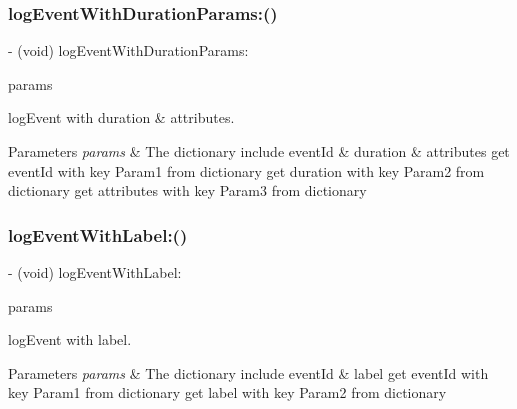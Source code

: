 \subsubsection{\texorpdfstring{log\+Event\+With\+Duration\+Params\+:()}{logEventWithDurationParams:()}}
{\footnotesize\ttfamily -\/ (void) log\+Event\+With\+Duration\+Params\+: \begin{DoxyParamCaption}\item[{(N\+S\+Mutable\+Dictionary$\ast$)}]{params }\end{DoxyParamCaption}}



log\+Event with duration \& attributes. 


\begin{DoxyParams}{Parameters}
{\em params} & The dictionary include event\+Id \& duration \& attributes get event\+Id with key \textquotesingle{}Param1\textquotesingle{} from dictionary get duration with key \textquotesingle{}Param2\textquotesingle{} from dictionary get attributes with key \textquotesingle{}Param3\textquotesingle{} from dictionary \\
\hline
\end{DoxyParams}
\mbox{\label{interfaceAnalyticsUmeng_a5b8db94d1204380c03576d2ba482a62a}} 
\subsubsection{\texorpdfstring{log\+Event\+With\+Label\+:()}{logEventWithLabel:()}}
{\footnotesize\ttfamily -\/ (void) log\+Event\+With\+Label\+: \begin{DoxyParamCaption}\item[{(N\+S\+Mutable\+Dictionary$\ast$)}]{params }\end{DoxyParamCaption}}



log\+Event with label. 


\begin{DoxyParams}{Parameters}
{\em params} & The dictionary include event\+Id \& label get event\+Id with key \textquotesingle{}Param1\textquotesingle{} from dictionary get label with key \textquotesingle{}Param2\textquotesingle{} from dictionary \\
\hline
\end{DoxyParams}
\mbox{\label{interfaceAnalyticsUmeng_a21b066fcb09e160ffb7bb93be5fd85bc}} 
